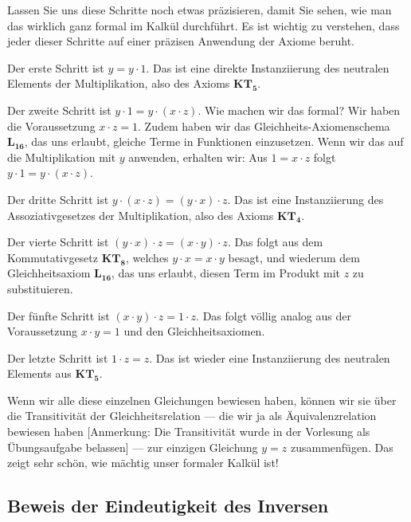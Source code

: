 \begin{spoken-clean}[01:11:42 - 01:14:42]
Lassen Sie uns diese Schritte noch etwas präzisieren, damit Sie sehen, wie man das wirklich ganz formal im Kalkül durchführt. Es ist wichtig zu verstehen, dass jeder dieser Schritte auf einer präzisen Anwendung der Axiome beruht. 

Der erste Schritt ist $y = y \cdot 1$. Das ist eine direkte Instanziierung des neutralen Elements der Multiplikation, also des Axioms $\mathbf{KT_5}$. 

Der zweite Schritt ist $y \cdot 1 = y \cdot (x \cdot z)$. Wie machen wir das formal? Wir haben die Voraussetzung $x \cdot z = 1$. Zudem haben wir das Gleichheits-Axiomenschema $\mathbf{L_{16}}$, das uns erlaubt, gleiche Terme in Funktionen einzusetzen. Wenn wir das auf die Multiplikation mit $y$ anwenden, erhalten wir: Aus $1 = x \cdot z$ folgt $y \cdot 1 = y \cdot (x \cdot z)$. 

Der dritte Schritt ist $y \cdot (x \cdot z) = (y \cdot x) \cdot z$. Das ist eine Instanziierung des Assoziativgesetzes der Multiplikation, also des Axioms $\mathbf{KT_4}$. 

Der vierte Schritt ist $(y \cdot x) \cdot z = (x \cdot y) \cdot z$. Das folgt aus dem Kommutativgesetz $\mathbf{KT_8}$, welches $y \cdot x = x \cdot y$ besagt, und wiederum dem Gleichheitsaxiom $\mathbf{L_{16}}$, das uns erlaubt, diesen Term im Produkt mit $z$ zu substituieren. 

Der fünfte Schritt ist $(x \cdot y) \cdot z = 1 \cdot z$. Das folgt völlig analog aus der Voraussetzung $x \cdot y = 1$ und den Gleichheitsaxiomen. 

Der letzte Schritt ist $1 \cdot z = z$. Das ist wieder eine Instanziierung des neutralen Elements aus $\mathbf{KT_5}$. 

Wenn wir alle diese einzelnen Gleichungen bewiesen haben, können wir sie über die Transitivität der Gleichheitsrelation --- die wir ja als Äquivalenzrelation bewiesen haben [Anmerkung: Die Transitivität wurde in der Vorlesung als Übungsaufgabe belassen] --- zur einzigen Gleichung $y = z$ zusammenfügen. Das zeigt sehr schön, wie mächtig unser formaler Kalkül ist!
\end{spoken-clean}

\subsection{Beweis der Eindeutigkeit des Inversen}


